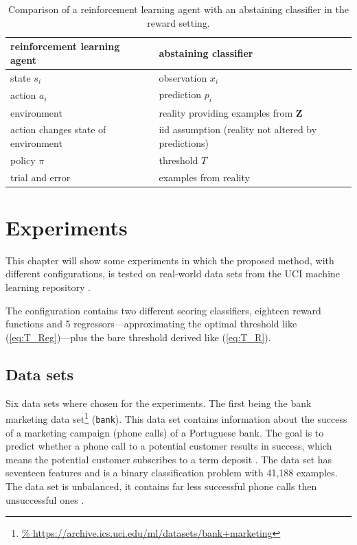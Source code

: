 \documentclass[twoside,11pt]{article}
\def\Z{\textbf{Z}}
\begin{document}
\begin{table}
  \begin{center}
  \begin{tabu}{l|l}
    reinforcement learning agent &abstaining classifier \\
    \hline
    state $s_i$ &observation $x_i$ \\
    action $a_i$ &prediction $p_i$ \\
    environment &reality providing examples from $\Z$ \\
    action changes state of environment
    &iid assumption (reality not altered by predictions)\\
    policy $\pi$ &threshold $T$ \\
    trial and error &examples from reality
  \end{tabu}
  \end{center}
  \caption{Comparison of a reinforcement learning agent
            with an abstaining classifier in the reward
            setting.}
  \label{tab:rl_vs_ac}
\end{table}


\section{Experiments}
\label{sec:experiments}

This chapter will show some experiments in which the
proposed method, with different configurations, is tested
on real-world data sets from the UCI machine learning
repository \citep[see][]{uci}.

The configuration contains two different scoring
classifiers, eighteen reward functions and 5
regressors---approximating the optimal threshold like
(\ref{eq:T_Reg})---plus the bare threshold derived like
(\ref{eq:T_R}).

\subsection{Data sets}

Six data sets where chosen for the experiments. The first
being the bank marketing data set\footnote{\url{%
  https://archive.ics.uci.edu/ml/datasets/bank+marketing}}
(\texttt{bank}).
This data set contains information about the success of
a marketing campaign (phone calls) of a Portuguese bank.
The goal is to predict whether a phone call to a potential
customer results in success, which means the potential
customer subscribes to a term deposit
\citep[see][]{moro_et_al_2014}.
The data set has seventeen features and is a binary
classification problem with 41,188 examples.
The data set is unbalanced, it contains far less successful
phone calls then unsuccessful ones
\citep[see][]{moro_et_al_2014}.
\end{document}
